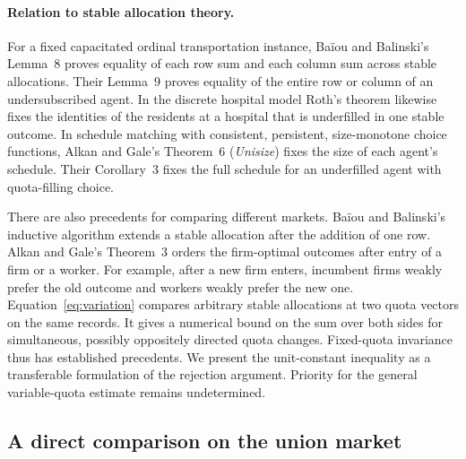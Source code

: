 \documentclass[11pt,letterpaper]{article}
\begin{document}
\paragraph{Relation to stable allocation theory.}
For a fixed capacitated ordinal transportation instance, Baïou and
Balinski's Lemma~8 proves equality of each row sum and each column sum
across stable allocations. Their Lemma~9 proves equality of the entire row
or column of an undersubscribed agent. \cite[p.~674, Lemmas 8--9]{bb}
In the discrete hospital model Roth's theorem
likewise fixes the identities of the residents at a hospital that is
underfilled in one stable outcome. \cite[p.~426]{roth} In schedule matching with consistent,
persistent, size-monotone choice functions, Alkan and Gale's Theorem~6
(\emph{Unisize}) fixes the size of each agent's schedule. Their Corollary~3
fixes the full schedule for an underfilled agent with quota-filling choice.
\cite[Theorem 6 and Corollary 3]{alkan}

There are also precedents for comparing different markets. Baïou and
Balinski's inductive algorithm extends a stable allocation after the
addition of one row. \cite[\S2, Theorem 2]{bb} Alkan and Gale's Theorem~3
orders the firm-optimal outcomes after entry of a firm or a worker.
For example, after a new firm enters, incumbent firms weakly prefer the
old outcome and workers weakly prefer the new one. \cite[Theorem 3]{alkan}
Equation~\eqref{eq:variation}
compares arbitrary stable allocations at two quota vectors on the same
records. It gives a numerical bound on the sum over both sides for
simultaneous, possibly oppositely directed quota changes. Fixed-quota
invariance thus has established precedents. We present the unit-constant
inequality as a transferable formulation of the rejection argument.
Priority for the general variable-quota estimate remains undetermined.
\cite[Lemmas 5--6]{kintali}

\subsection{A direct comparison on the union market}
\end{document}
